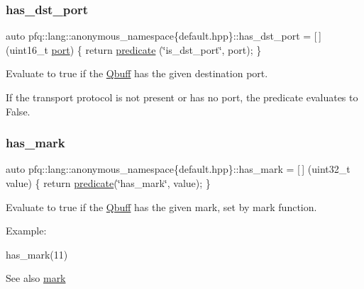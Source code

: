 \subsubsection{\texorpdfstring{has\+\_\+dst\+\_\+port}{has\_dst\_port}}
{\footnotesize\ttfamily auto pfq\+::lang\+::anonymous\+\_\+namespace\{default.\+hpp\}\+::has\+\_\+dst\+\_\+port = \mbox{[}$\,$\mbox{]} (uint16\+\_\+t \hyperlink{namespacepfq_1_1lang_1_1anonymous__namespace_02default_8hpp_03_a868eca03290a037cb4e9b7075085888b}{port}) \{ return \hyperlink{namespacepfq_1_1lang_aca9adafc436b7f851621b979fa1aaf88}{predicate} (\char`\"{}is\+\_\+dst\+\_\+port\char`\"{}, port); \}}



Evaluate to {\ttfamily true} if the \hyperlink{structpfq_1_1lang_1_1Qbuff}{Qbuff} has the given destination port. 

If the transport protocol is not present or has no port, the predicate evaluates to False. \mbox{\label{namespacepfq_1_1lang_1_1anonymous__namespace_02default_8hpp_03_aa4ce1fdb0d99e1ca0afdf76619c58d12}} 
\subsubsection{\texorpdfstring{has\+\_\+mark}{has\_mark}}
{\footnotesize\ttfamily auto pfq\+::lang\+::anonymous\+\_\+namespace\{default.\+hpp\}\+::has\+\_\+mark = \mbox{[}$\,$\mbox{]} (uint32\+\_\+t value) \{ return \hyperlink{namespacepfq_1_1lang_aca9adafc436b7f851621b979fa1aaf88}{predicate}(\char`\"{}has\+\_\+mark\char`\"{}, value); \}}



Evaluate to {\ttfamily true} if the \hyperlink{structpfq_1_1lang_1_1Qbuff}{Qbuff} has the given {\ttfamily mark}, set by mark function. 

Example\+:

has\+\_\+mark(11)

\begin{DoxySeeAlso}{See also}
\hyperlink{namespacepfq_1_1lang_1_1anonymous__namespace_02default_8hpp_03_a7b831baeabda070b89ca862a9445a4a8}{mark} 
\end{DoxySeeAlso}
\mbox{\label{namespacepfq_1_1lang_1_1anonymous__namespace_02default_8hpp_03_a9f7161b8dfb842c5a845f413eb6bc82f}} 
